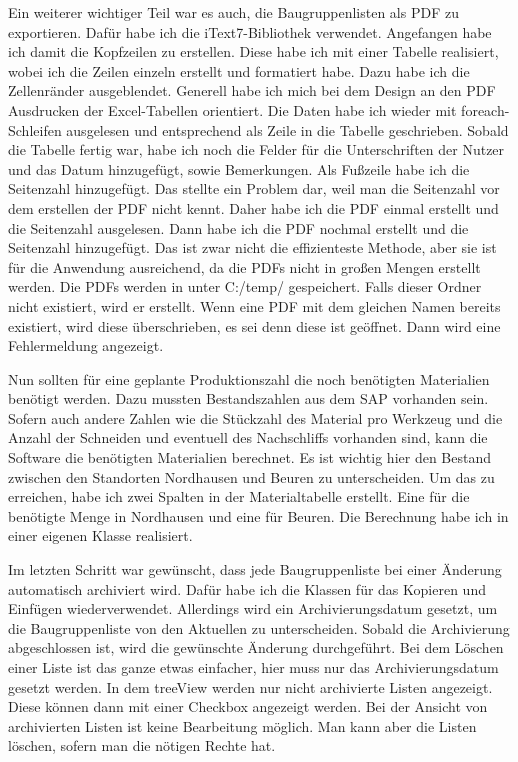 \documentclass{Vorlage}
\begin{document}
Ein weiterer wichtiger Teil war es auch, die Baugruppenlisten als PDF zu exportieren. Dafür habe ich
die iText7-Bibliothek verwendet. Angefangen habe ich damit die Kopfzeilen zu erstellen. Diese habe ich
mit einer Tabelle realisiert, wobei ich die Zeilen einzeln erstellt und formatiert habe. Dazu habe ich
die Zellenränder ausgeblendet. Generell habe ich mich bei dem Design an den PDF Ausdrucken der
Excel-Tabellen orientiert. Die Daten habe ich wieder mit foreach-Schleifen ausgelesen und entsprechend 
als Zeile in die Tabelle geschrieben. Sobald die Tabelle fertig war, habe ich noch die Felder für die
Unterschriften 
der Nutzer und das Datum hinzugefügt, sowie Bemerkungen. Als Fußzeile habe ich die Seitenzahl hinzugefügt.
Das stellte ein Problem dar, weil man die Seitenzahl vor dem erstellen der PDF nicht kennt. Daher habe ich
die PDF einmal erstellt und die Seitenzahl ausgelesen. Dann habe ich die PDF nochmal erstellt und die
Seitenzahl hinzugefügt. Das ist zwar nicht die effizienteste Methode, aber sie ist für die Anwendung
ausreichend, da die PDFs nicht in großen Mengen erstellt werden. Die PDFs werden in unter C:/temp/ gespeichert.
Falls dieser Ordner nicht existiert, wird er erstellt. Wenn eine PDF mit dem gleichen Namen bereits existiert,
wird diese überschrieben, es sei denn diese ist geöffnet. Dann wird eine Fehlermeldung angezeigt.

Nun sollten für eine geplante Produktionszahl die noch benötigten Materialien benötigt werden. Dazu mussten
Bestandszahlen aus dem SAP vorhanden sein. Sofern auch andere Zahlen wie die Stückzahl des Material pro Werkzeug
und die Anzahl der Schneiden und eventuell des Nachschliffs vorhanden sind, kann die Software die benötigten
Materialien berechnet. Es ist wichtig hier den Bestand zwischen den Standorten Nordhausen und Beuren zu 
unterscheiden. Um das zu erreichen, habe ich zwei Spalten in der Materialtabelle erstellt. Eine für die benötigte
Menge in Nordhausen und eine für Beuren. Die Berechnung habe ich in einer eigenen Klasse realisiert.

Im letzten Schritt war gewünscht, dass jede Baugruppenliste bei einer Änderung automatisch archiviert wird.
Dafür habe ich die Klassen für das Kopieren und Einfügen wiederverwendet. Allerdings wird ein
Archivierungsdatum gesetzt, um die Baugruppenliste von den Aktuellen zu unterscheiden. Sobald die Archivierung
abgeschlossen ist, wird die gewünschte Änderung durchgeführt. Bei dem Löschen einer Liste ist das ganze etwas
einfacher, hier muss nur das Archivierungsdatum gesetzt werden. In dem treeView werden nur nicht archivierte
Listen angezeigt. Diese können dann mit einer Checkbox angezeigt werden. Bei der Ansicht von archivierten 
Listen ist keine Bearbeitung möglich. Man kann aber die Listen löschen, sofern man die nötigen Rechte hat.
\end{document}
